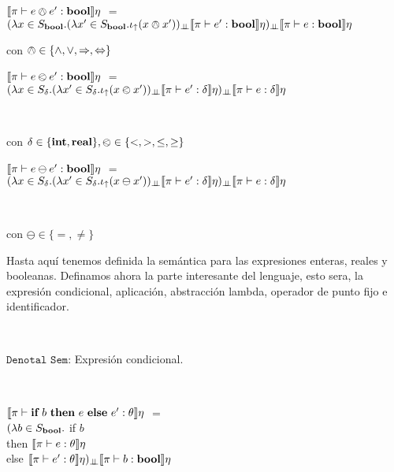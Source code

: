 \noindent
$\llbracket \pi \vdash e \owedge e' : \textbf{bool} \rrbracket\eta$ $=$ \\
				\indent \indent \indent $(\lambda x \in S_{\textbf{bool}} . 
											(\lambda x' \in S_{\textbf{bool}} . \iota_{\uparrow} (x \owedge x'))_{\bot \!\!\! \bot}
													\llbracket \pi \vdash e' : \textbf{bool} \rrbracket\eta)_{\bot \!\!\! \bot}
														\llbracket \pi \vdash e : \textbf{bool} \rrbracket\eta$

\begin{center}
con $\owedge \in \{\wedge,\vee,\Rightarrow,\Leftrightarrow\}$
\end{center}

\begin{center}

$\llbracket \pi \vdash e \olessthan e' : \textbf{bool} \rrbracket\eta$ $=$ $(\lambda x \in S_\delta . 
											(\lambda x' \in S_\delta . \iota_{\uparrow} (x \olessthan x'))_{\bot \!\!\! \bot}
													\llbracket \pi \vdash e' : \delta \rrbracket\eta)_{\bot \!\!\! \bot}
														\llbracket \pi \vdash e : \delta \rrbracket\eta$

\

con $\delta \in \{\textbf{int}, \textbf{real} \}, \olessthan \in \{<,>,\leq,\geq\}$
\end{center}

\begin{center}

$\llbracket \pi \vdash e \ominus e' : \textbf{bool} \rrbracket\eta$ $=$ $(\lambda x \in S_\delta . 
											(\lambda x' \in S_\delta . \iota_{\uparrow} (x \ominus x'))_{\bot \!\!\! \bot}
													\llbracket \pi \vdash e' : \delta \rrbracket\eta)_{\bot \!\!\! \bot}
														\llbracket \pi \vdash e : \delta \rrbracket\eta$

\

con $\ominus \in \{=,\neq\}$
\end{center}

Hasta aqu\'i tenemos definida la sem\'antica para las expresiones enteras,
reales y booleanas. Definamos ahora la parte interesante del lenguaje, esto 
sera, la expresi\'on condicional, aplicaci\'on, abstracci\'on lambda, operador
de punto fijo e identificador.

\

\noindent
$\texttt{Denotal Sem:}$ Expresi\'on condicional.\

\

$\llbracket \pi \vdash \textbf{if} \ b \ \textbf{then} \ e \ \textbf{else} \ e' : \theta \rrbracket\eta$ $=$\\
		\indent \indent \indent $(\lambda b \in S_{\textbf{bool}} .$ if $b$ \\
		\indent \indent \indent \indent \indent \indent \indent 
											then $\llbracket \pi \vdash e : \theta \rrbracket\eta$\\
		\indent \indent \indent \indent \indent \indent \indent 
											else $\llbracket \pi \vdash e' : \theta \rrbracket\eta)_{\bot \!\!\! \bot}\llbracket \pi \vdash b : \textbf{bool} \rrbracket\eta$

